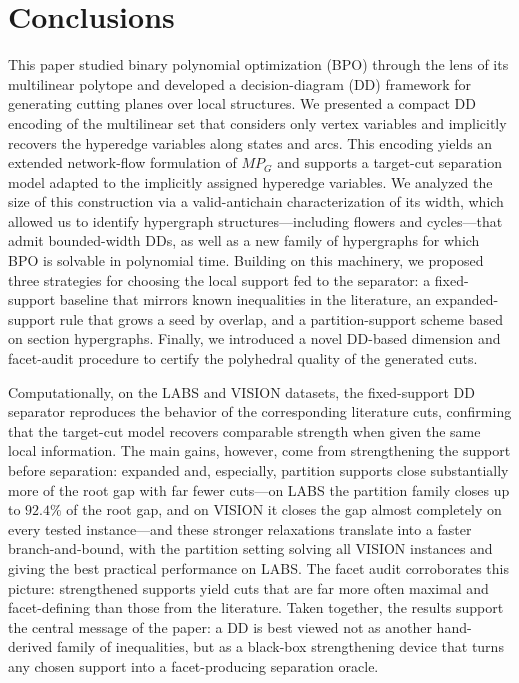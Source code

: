 \section{Conclusions}
\label{sec:discussion}


This paper studied binary polynomial optimization (BPO) through the lens of its multilinear polytope and developed a decision-diagram (DD) framework for generating cutting planes over local structures. We presented a compact DD encoding of the multilinear set that considers only vertex variables and implicitly recovers the hyperedge variables along states and arcs. This encoding yields an extended network-flow formulation of $MP_G$ and supports a target-cut separation model adapted to the implicitly assigned hyperedge variables. We analyzed the size of this construction via a valid-antichain characterization of its width, which allowed us to identify hypergraph structures---including flowers and cycles---that admit bounded-width DDs, as well as a new family of hypergraphs for which BPO is solvable in polynomial time. Building on this machinery, we proposed three strategies for choosing the local support fed to the separator: a fixed-support baseline that mirrors known inequalities in the literature, an expanded-support rule that grows a seed by overlap, and a partition-support scheme based on section hypergraphs. Finally, we introduced a novel DD-based dimension and facet-audit procedure to certify the polyhedral quality of the generated cuts.

Computationally, on the LABS and VISION datasets, the fixed-support DD separator reproduces the behavior of the corresponding literature cuts, confirming that the target-cut model recovers comparable strength when given the same local information. The main gains, however, come from strengthening the support before separation: expanded and, especially, partition supports close substantially more of the root gap with far fewer cuts---on LABS the partition family closes up to $92.4\%$ of the root gap, and on VISION it closes the gap almost completely on every tested instance---and these stronger relaxations translate into a faster branch-and-bound, with the partition setting solving all VISION instances and giving the best practical performance on LABS. The facet audit corroborates this picture: strengthened supports yield cuts that are far more often maximal and facet-defining than those from the literature. Taken together, the results support the central message of the paper: a DD is best viewed not as another hand-derived family of inequalities, but as a black-box strengthening device that turns any chosen support into a facet-producing separation oracle.

